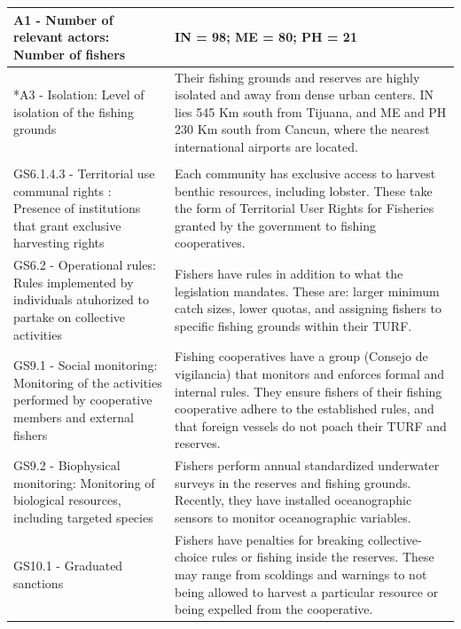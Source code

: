 \documentclass{frontiersSCNS}
\begin{document}
\begin{table}[H]
{\begin{tabular}[t]{>{\raggedright\arraybackslash}p{6.5cm}|>{\raggedright\arraybackslash}p{12cm}}
\hline
\hspace{1em}A1 - Number of relevant actors: Number of fishers & IN = 98; ME = 80; PH = 21\\
\hline
\hspace{1em}*A3 - Isolation: Level of isolation of the fishing grounds & Their fishing grounds and reserves are highly isolated and away from dense urban centers. IN lies 545 Km south from Tijuana, and ME and PH 230 Km south from Cancun, where the nearest international airports are located.\\
\hline
\multicolumn{2}{l}{\textbf{Governance system (G)}}\\
\hline
\hspace{1em}GS6.1.4.3 - Territorial use communal rights : Presence of institutions that grant exclusive harvesting rights & Each community has exclusive access to harvest benthic resources, including lobster. These take the form of Territorial User Rights for Fisheries granted by the government to fishing cooperatives.\\
\hline
\hspace{1em}GS6.2 - Operational rules: Rules implemented by individuals atuhorized to partake on collective activities & Fishers have rules in addition to what the legislation mandates. These are: larger minimum catch sizes, lower quotas, and assigning fishers to specific fishing grounds within their TURF.\\
\hline
\hspace{1em}GS9.1 - Social monitoring: Monitoring of the activities performed by cooperative members and external fishers & Fishing cooperatives have a group (Consejo de vigilancia) that monitors and enforces formal and internal rules. They ensure fishers of their fishing cooperative adhere to the established rules, and that foreign vessels do not poach their TURF and reserves.\\
\hline
\hspace{1em}GS9.2 - Biophysical monitoring: Monitoring of biological resources, including targeted species & Fishers perform annual standardized underwater surveys in the reserves and fishing grounds. Recently, they have installed oceanographic sensors to monitor oceanographic variables.\\
\hline
GS10.1 - Graduated sanctions & Fishers have penalties for breaking collective-choice rules or fishing inside the reserves. These may range from scoldings and warnings to not being allowed to harvest a particular resource or being expelled from the cooperative.\\
\hline
\end{tabular}}
\end{table}
\end{document}
